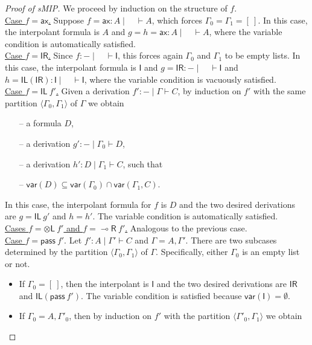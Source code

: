\documentclass[sn-mathphys-num]{sn-jnl}%
\newcommand{\GG}{\Gamma}
\newcommand{\vd}{\vdash}
\newcommand{\tl}{\otimes \mathsf{L}}
\newcommand{\pass}{\mathsf{pass}}
\newcommand{\unitl}{\mathsf{IL}}
\newcommand{\unitr}{\mathsf{IR}}
\newcommand{\ax}{\mathsf{ax}}
\newcommand{\lolli}{\multimap}
\newcommand{\lright}{{\lolli}\mathsf{R}}
\newcommand{\unit}{\mathsf{I}}
\newcommand{\mf}[1]{\mathsf{#1}}
\newcommand{\vars}[1]{\mf{var} (#1)}
\newcommand{\sMIP}{\textsf{sMIP}}
\theoremstyle{thmstyleone}%
\theoremstyle{thmstyletwo}%
\theoremstyle{thmstylethree}%
\begin{document}
\begin{proof}[Proof of \sMIP]
  We proceed by induction on the structure of $f$. 
  \\
  \underline{Case $f = \ax$.} Suppose $f = \ax : A \mid \quad \vd A$, which forces $\GG_0 = \GG_1 = [\ ]$.
  In this case, the interpolant formula is $A$ and $g = h = \ax : A \mid \quad \vd A$, where the variable condition is automatically satisfied.
  \\
  \underline{Case $f = \unitr$.} Since $f : {-} \mid \quad \vd \unit$, this forces again $\GG_0$ and $\GG_1$ to be empty lists.
  In this case, the interpolant formula is $\unit$ and $g =  \unitr : {-} \mid \quad \vd \unit$ and $h = \unitl (\unitr) : \unit \mid \quad \vd \unit$, where the variable condition is vacuously satisfied.
  \\
  \underline{Case $f = \unitl \ f'$.}
  Given a derivation $f' : {-} \mid \GG \vd C$, by induction on $f'$ with the same partition $\langle \GG_0, \GG_1 \rangle$ of $\GG$ we obtain  
  \begin{itemize}
    \item[--] a formula $D$,
    \item[--] a derivation $g' : {-} \mid \GG_0 \vd D$,
    \item[--] a derivation $h' : D \mid \GG_1 \vd C$, such that
    \item[--] $\vars{D} \subseteq \vars{\GG_0} \cap \vars{\GG_1 , C}$.
  \end{itemize}
  In this case, the interpolant formula for $f$ is $D$ and the two desired derivations are $g = \unitl \ g'$ and $h = h'$.
  The variable condition is automatically satisfied.
  \\
  \underline{Cases $f = \tl \ f'$ and $f = \lright \ f'$.} Analogous to the previous case.
  \\
  \underline{Case $f = \pass \ f'$}. Let $f' : A \mid \GG' \vd C$ and $\GG = A,\GG'$.
  There are two subcases determined by the partition $\langle \GG_0,\GG_1 \rangle$ of $\GG$. 
  Specifically, either $\GG_0$ is an empty list or not.
  \begin{itemize}
    \item If $\GG_0 = [\ ]$, then the interpolant is $\unit$ and the two desired derivations are $\unitr$ and $\unitl (\pass \ f')$.
    The variable condition is satisfied because $\vars{\unit} = \emptyset$.
    \item If $\GG_0 = A, \GG'_0$, then by induction on $f'$ with the partition $\langle \GG'_0, \GG_1 \rangle$ we obtain
    \begin{itemize}

\end{itemize}
\end{itemize}
\end{proof}
\end{document}
